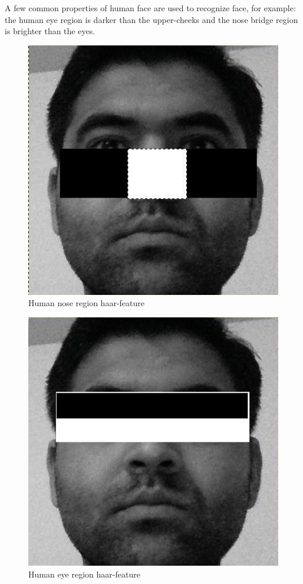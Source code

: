 \documentclass[10pt,twocolumn,letterpaper]{article}
\begin{document}
A few common properties of human face are used to recognize face, for example: the human eye region is darker than the upper-cheeks and the nose bridge region is brighter than the eyes.

\begin{figure}
  \begin{center}
    \includegraphics[width=\linewidth]{nose}
  \end{center}
  \caption{Human nose region haar-feature}
  \label{fig:human_nose}
\end{figure}

\begin{figure}
  \begin{center}
    \includegraphics[width=\linewidth]{eyes}
  \end{center}
  \caption{Human eye region haar-feature}
  \label{fig:human_eyes}
\end{figure}
\end{document}
